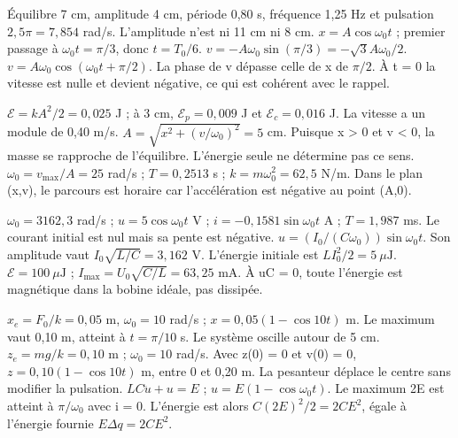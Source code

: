 Équilibre 7 cm, amplitude 4 cm, période 0,80 s, fréquence 1,25 Hz et pulsation $2{,}5\pi=7{,}854$ rad/s. L’amplitude n’est ni 11 cm ni 8 cm.
$x=A\cos\omega_0t$ ; premier passage à $\omega_0t=\pi/3$, donc $t=T_0/6$. $v=-A\omega_0\sin(\pi/3)=-\sqrt3A\omega_0/2$.
$v=A\omega_0\cos(\omega_0t+\pi/2)$. La phase de v dépasse celle de x de $\pi/2$. À t = 0 la vitesse est nulle et devient négative, ce qui est cohérent avec le rappel.


$\mathcal E=kA^2/2=0{,}025$ J ; à 3 cm, $\mathcal E_p=0{,}009$ J et $\mathcal E_c=0{,}016$ J. La vitesse a un module de 0,40 m/s.
$A=\sqrt{x^2+(v/\omega_0)^2}=5$ cm. Puisque x > 0 et v < 0, la masse se rapproche de l’équilibre. L’énergie seule ne détermine pas ce sens.
$\omega_0=v_{\max}/A=25$ rad/s ; $T=0{,}2513$ s ; $k=m\omega_0^2=62{,}5$ N/m. Dans le plan (x,v), le parcours est horaire car l’accélération est négative au point (A,0).


$\omega_0=3162{,}3$ rad/s ; $u=5\cos\omega_0t$ V ; $i=-0{,}1581\sin\omega_0t$ A ; $T=1{,}987$ ms. Le courant initial est nul mais sa pente est négative.
$u=(I_0/(C\omega_0))\sin\omega_0t$. Son amplitude vaut $I_0\sqrt{L/C}=3{,}162$ V. L’énergie initiale est $LI_0^2/2=5\ \mu\mathrm{ J}$.
$\mathcal E=100\ \mu\mathrm{ J}$ ; $I_{\max}=U_0\sqrt{C/L}=63{,}25$ mA. À uC = 0, toute l’énergie est magnétique dans la bobine idéale, pas dissipée.


$x_e=F_0/k=0{,}05$ m, $\omega_0=10$ rad/s ; $x=0{,}05(1-\cos10t)$ m. Le maximum vaut 0,10 m, atteint à $t=\pi/10$ s. Le système oscille autour de 5 cm.
$z_e=mg/k=0{,}10$ m ; $\omega_0=10$ rad/s. Avec z(0) = 0 et v(0) = 0, $z=0{,}10(1-\cos10t)$ m, entre 0 et 0,20 m. La pesanteur déplace le centre sans modifier la pulsation.
$LC\ddot u+u=E$ ; $u=E(1-\cos\omega_0t)$. Le maximum 2E est atteint à $\pi/\omega_0$ avec i = 0. L’énergie est alors $C(2E)^2/2=2CE^2$, égale à l’énergie fournie $E\Delta q=2CE^2$.


